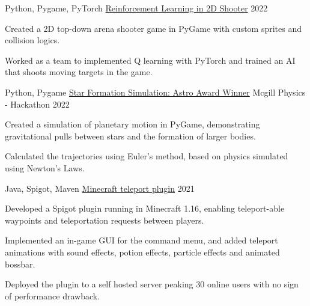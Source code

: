 

\begin{cventries}

  \cventry
    {Python, Pygame, PyTorch} %
    {\href{https://github.com/shiqui/TSDP-Reinforcement-Learning-in-Video-Games}{Reinforcement Learning in 2D Shooter}} %
    {} %
    {2022} %
    {
      \begin{cvitems} %
        \item {Created a 2D top-down arena shooter game in PyGame with custom sprites and collision logics.}
        \item {Worked as a team to implemented Q learning with PyTorch and trained an AI that shoots moving targets in the game.}
      \end{cvitems}
    }

  \cventry
    {Python, Pygame} %
    {\href{https://devpost.com/software/star-formation}{Star Formation Simulation: Astro Award Winner}} %
    {Mcgill Physics - Hackathon} %
    {2022} %
    {
      \begin{cvitems} %
        \item {Created a simulation of planetary motion in PyGame, demonstrating gravitational pulls between stars and the formation of larger bodies.}
        \item {Calculated the trajectories using Euler's method, based on physics simulated using Newton's Laws.}
      \end{cvitems}
    }
    
  \cventry
    {Java, Spigot, Maven} %
    {\href{https://github.com/shiqui/Teleport-Plugin}{Minecraft teleport plugin}} %
    {} %
    {2021} %
    {
      \begin{cvitems} %
        \item {Developed a Spigot plugin running in Minecraft 1.16, enabling teleport-able waypoints and teleportation requests between players.}
        \item {Implemented an in-game GUI for the command menu, and added teleport animations with sound effects, potion effects, particle effects and animated bossbar.}
        \item {Deployed the plugin to a self hosted server peaking 30 online users with no sign of performance drawback.}
      \end{cvitems}
    }


\end{cventries}

